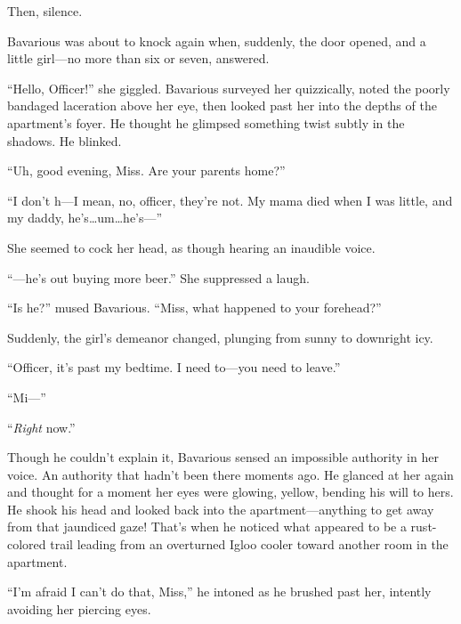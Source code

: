 Then, silence.



Bavarious was about to knock again when, suddenly, the door opened,
and a little girl---no more than six or seven, answered.



``Hello, Officer!'' she giggled. Bavarious surveyed her quizzically,
noted the poorly bandaged laceration above her eye, then looked
past her into the depths of the apartment's foyer. He thought he
glimpsed something twist subtly in the shadows. He blinked.



``Uh, good evening, Miss. Are your parents home?''



``I don't h---I mean, no, officer, they're not. My mama died
when I was little, and my daddy, he's{\ldots}um{\ldots}he's---''



She seemed to cock her head, as though hearing an inaudible
voice.



``---he's out buying more beer.'' She suppressed a laugh.



``Is he?'' mused Bavarious. ``Miss, what happened to your
forehead?''



Suddenly, the girl's demeanor changed, plunging from sunny to
downright icy.



``Officer, it's past my bedtime. I need to---you need to
leave.''



``Mi---''



``{\em Right} now.''



Though he couldn't explain it, Bavarious sensed an impossible
authority in her voice. An authority that hadn't been there moments
ago. He glanced at her again and thought for a moment her eyes were
glowing, yellow, bending his will to hers. He shook his head and
looked back into the apartment---anything to get away from that
jaundiced gaze! That's when he noticed what appeared to be a
rust-colored trail leading from an overturned Igloo cooler toward
another room in the apartment.



``I'm afraid I can't do that, Miss,'' he intoned as he brushed past
her, intently avoiding her piercing eyes.



